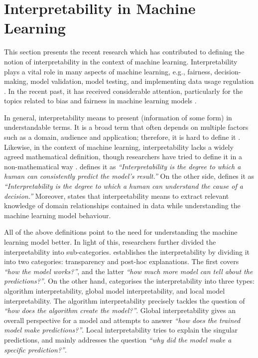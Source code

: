 \documentclass[english]{tktltiki2}
\theoremstyle{definition}
\theoremstyle{remark}
\begin{document}
\section{Interpretability in Machine Learning}\label{sec:interpretability_in_ML} 
This section presents the recent research which has contributed to defining the notion of interpretability in the context of machine learning. Interpretability plays a vital role in many aspects of machine learning, e.g., fairness, decision-making, model validation, model testing, and implementing data usage regulation \citep{guidotti2018survey, zhang2019machine}. In the recent past, it has received considerable attention, particularly for the topics related to bias and fairness in machine learning models \citep{cathy2017weapons, molnarinterpretable}.

In general, interpretability means to present (information of some form) in understandable terms. It is a broad term that often depends on multiple factors such as a domain, audience and application; therefore, it is hard to define it \citep{ruping2006learning, kim2016examples, miller2018explanation, molnarinterpretable, murdoch2019interpretable}. Likewise, in the context of machine learning, interpretability lacks a widely agreed mathematical definition, though researchers have tried to define it in a non-mathematical way \citep{molnarinterpretable}. \citet{kim2016examples} defines it as \textit{“Interpretability is the degree to which a human can consistently predict the model’s result.”}  On the other side, \citet{miller2018explanation} defines it as \textit{“Interpretability is the degree to which a human can understand the cause of a decision.”} Moreover, \citet{murdoch2019interpretable} states that interpretability means to extract relevant knowledge of domain relationships contained in data while understanding the machine learning model behaviour. 

All of the above definitions point to the need for understanding the machine learning model better. In light of this, researchers further divided the interpretability into sub-categories. \citet{lipton2016mythos} establishes the interpretability by dividing it into two categories: transparency and post-hoc explanations. The first covers \textit{“how the model works?”}, and the latter \textit{“how much more model can tell about the predictions?”}. On the other hand, \citet{molnarinterpretable} categorises the interpretability into three types: algorithm interpretability, global model interpretability, and local model interpretability. The algorithm interpretability precisely tackles the question of \textit{“how does the algorithm create the model?”}. Global interpretability gives an overall perspective for a model and attempts to answer \textit{“how does the trained model make predictions?”}. Local interpretability tries to explain the singular predictions, and mainly addresses the question \textit{“why did the model make a specific prediction?”}.
\end{document}
